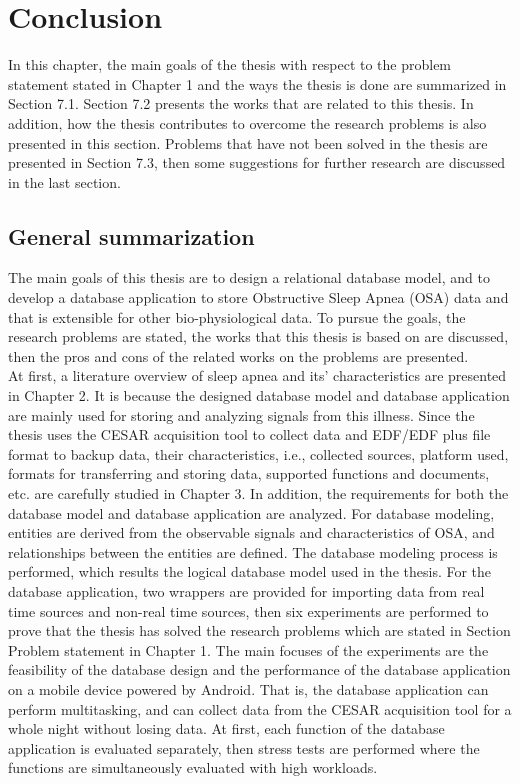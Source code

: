 
\chapter{Conclusion}%

\label{Chapter7} %
In this chapter, the main goals of the thesis with respect to the problem statement stated in Chapter 1 and the ways the thesis is done are summarized in Section 7.1. Section 7.2 presents the works that are related to this thesis. In addition, how the thesis contributes to overcome the research problems is also presented in this section. Problems that have not been solved in the thesis are presented in Section 7.3, then some suggestions for further research are discussed in the last section.

\section{General summarization}
The main goals of this thesis are to design a relational database model, and to develop a database application to store Obstructive Sleep Apnea (OSA) data and that is extensible for other bio-physiological data. To pursue the goals, the research problems are stated, the works that this thesis is based on are discussed, then the pros and cons of the related works on the problems are presented.\\
At first, a literature overview of sleep apnea and its’ characteristics are presented in Chapter 2. It is because the designed database model and database application are mainly used for storing and analyzing signals from this illness. Since the thesis uses the CESAR acquisition tool to collect data and EDF/EDF plus file format to backup data, their characteristics, i.e., collected sources, platform used, formats for transferring and storing data, supported functions and documents, etc. are carefully studied in Chapter 3. In addition, the requirements for both the database model and database application are analyzed. For database modeling, entities are derived from the observable signals and characteristics of OSA, and relationships between the entities are defined. The database modeling process is performed, which results the logical database model used in the thesis. For the database application, two wrappers are provided for importing data from real time sources and non-real time sources, then six experiments are performed to prove that the thesis has solved the research problems which are stated in Section Problem statement in Chapter 1. The main focuses of the experiments are the feasibility of the database design and the performance of the database application on a mobile device powered by Android. That is, the database application can perform multitasking, and can collect data from the CESAR acquisition tool for a whole night without losing data. At first, each function of the database application is evaluated separately, then stress tests are performed where the functions are simultaneously evaluated with high workloads.
